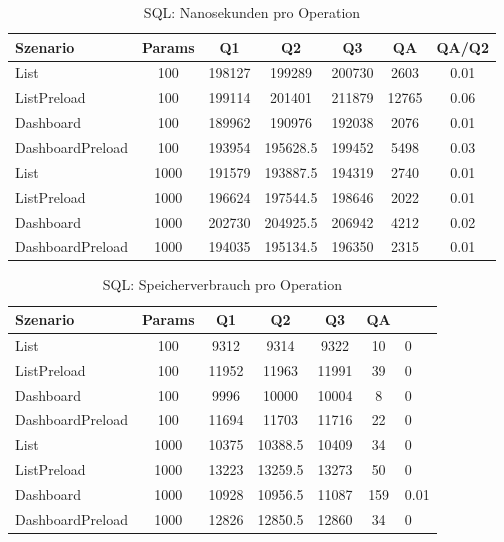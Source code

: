 
\begin{table}[ht]
\centering
\caption{SQL: Nanosekunden pro Operation}
\begin{tabular}{lcccccc}
\toprule
Szenario & Params & Q1 & Q2 & Q3 & QA & QA/Q2 \\
\midrule
	List & 100 & 198127 & 199289 & 200730 & 2603 & 0.01 \\
	ListPreload & 100 & 199114 & 201401 & 211879 & 12765 & 0.06 \\
	Dashboard & 100 & 189962 & 190976 & 192038 & 2076 & 0.01 \\
	DashboardPreload & 100 & 193954 & 195628.5 & 199452 & 5498 & 0.03 \\
	List & 1000 & 191579 & 193887.5 & 194319 & 2740 & 0.01 \\
	ListPreload & 1000 & 196624 & 197544.5 & 198646 & 2022 & 0.01 \\
	Dashboard & 1000 & 202730 & 204925.5 & 206942 & 4212 & 0.02 \\
	DashboardPreload & 1000 & 194035 & 195134.5 & 196350 & 2315 & 0.01 \\
\bottomrule
\end{tabular}
\label{tab:benchmark_sql_nsperop}
\end{table}
	
\begin{table}[ht]
\centering
\caption{SQL: Speicherverbrauch pro Operation}
\begin{tabular}{lccccc}
\toprule
Szenario & Params & Q1 & Q2 & Q3 & QA \\
\midrule
	List & 100 & 9312 & 9314 & 9322 & 10 & 0 \\
	ListPreload & 100 & 11952 & 11963 & 11991 & 39 & 0 \\
	Dashboard & 100 & 9996 & 10000 & 10004 & 8 & 0 \\
	DashboardPreload & 100 & 11694 & 11703 & 11716 & 22 & 0 \\
	List & 1000 & 10375 & 10388.5 & 10409 & 34 & 0 \\
	ListPreload & 1000 & 13223 & 13259.5 & 13273 & 50 & 0 \\
	Dashboard & 1000 & 10928 & 10956.5 & 11087 & 159 & 0.01 \\
	DashboardPreload & 1000 & 12826 & 12850.5 & 12860 & 34 & 0 \\
\bottomrule
\end{tabular}
\label{tab:benchmark_sql_bytesperop}
\end{table}
	
